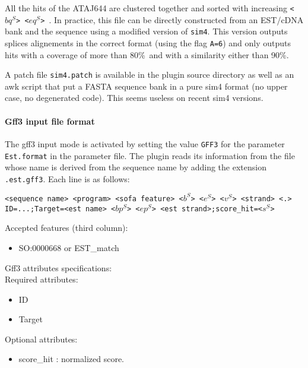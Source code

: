 All the hits of the ATAJ644 are clustered together and sorted with
increasing \texttt{<$bq^S$> <$eq^S$> }. In practice, this file can be
directly constructed from an EST/cDNA bank and the sequence using a
modified version of \texttt{sim4}. This version outputs splices
alignements in the correct format (using the flag \texttt{A=6}) and
only outputs hits with a coverage of more than 80\%\ and with a
similarity either than 90\%.

A patch file \texttt{sim4.patch} is available in the plugin source
directory as well as an awk script that put a FASTA sequence bank in a
pure sim4 format (no upper case, no degenerated code). This seems
useless on recent sim4 versions.

\paragraph{Gff3 input file format}

The gff3 input mode is activated by setting the value \texttt{GFF3}
for the parameter \texttt{Est.format} in the parameter file.  The
plugin reads its information from the file whose name is derived from
the sequence name by adding the extension \texttt{.est.gff3}. Each
line is as follows:


\texttt{<sequence name> <program> <sofa feature> <$b^S$> <$e^S$> <$v^S$> <strand> <.> ID=...;Target=<est name> <$bp^S$> <$ep^S$> <est strand>;score\_hit=<$s^S$>}

Accepted features (third column):\\
\begin{itemize}
\item  SO:0000668 or EST\_match
\end{itemize}


Gff3 attributes specifications:\\
Required attributes:\\ 
	\begin{itemize}
	\item ID
	\item Target
	\end{itemize}

Optional attributes:\\
	\begin{itemize}
	\item score\_hit :  normalized score.
	\end{itemize}


